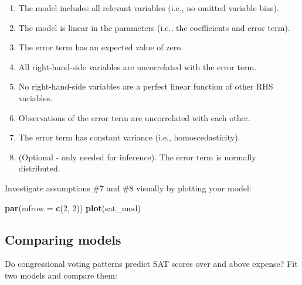 \documentclass[]{book}
\newenvironment{Shaded}{\begin{snugshade}}{\end{snugshade}}
\newcommand{\KeywordTok}[1]{\textcolor[rgb]{0.13,0.29,0.53}{\textbf{#1}}}
\newcommand{\DataTypeTok}[1]{\textcolor[rgb]{0.13,0.29,0.53}{#1}}
\newcommand{\DecValTok}[1]{\textcolor[rgb]{0.00,0.00,0.81}{#1}}
\newcommand{\StringTok}[1]{\textcolor[rgb]{0.31,0.60,0.02}{#1}}
\newcommand{\CommentTok}[1]{\textcolor[rgb]{0.56,0.35,0.01}{\textit{#1}}}
\newcommand{\OperatorTok}[1]{\textcolor[rgb]{0.81,0.36,0.00}{\textbf{#1}}}
\newcommand{\NormalTok}[1]{#1}
\providecommand{\tightlist}{%
  \setlength{\itemsep}{0pt}\setlength{\parskip}{0pt}}
\begin{document}
\begin{enumerate}
\def\labelenumi{\arabic{enumi}.}
\tightlist
\item
  The model includes all relevant variables (i.e., no omitted variable
  bias).
\item
  The model is linear in the parameters (i.e., the coefficients and
  error term).
\item
  The error term has an expected value of zero.
\item
  All right-hand-side variables are uncorrelated with the error term.
\item
  No right-hand-side variables are a perfect linear function of other
  RHS variables.
\item
  Observations of the error term are uncorrelated with each other.
\item
  The error term has constant variance (i.e., homoscedasticity).
\item
  (Optional - only needed for inference). The error term is normally
  distributed.
\end{enumerate}

Investigate assumptions \#7 and \#8 visually by plotting your model:

\begin{Shaded}
\begin{Highlighting}[]
  \KeywordTok{par}\NormalTok{(}\DataTypeTok{mfrow =} \KeywordTok{c}\NormalTok{(}\DecValTok{2}\NormalTok{, }\DecValTok{2}\NormalTok{)) }
  \KeywordTok{plot}\NormalTok{(sat_mod)}
\end{Highlighting}
\end{Shaded}

\subsection{Comparing models}\label{comparing-models}

Do congressional voting patterns predict SAT scores over and above
expense? Fit two models and compare them:

\begin{Shaded}
\end{Shaded}
\end{document}
